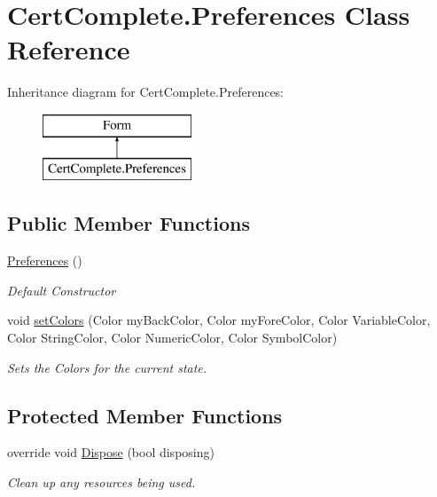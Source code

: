 \hypertarget{class_cert_complete_1_1_preferences}{}\section{Cert\+Complete.\+Preferences Class Reference}
\label{class_cert_complete_1_1_preferences}
Inheritance diagram for Cert\+Complete.\+Preferences\+:\begin{figure}[H]
\begin{center}
\leavevmode
\includegraphics[height=2.000000cm]{class_cert_complete_1_1_preferences}
\end{center}
\end{figure}
\subsection*{Public Member Functions}
\begin{DoxyCompactItemize}
\item 
\mbox{\hyperlink{class_cert_complete_1_1_preferences_a5a7e543437dd3ef1fcde6476be53edaa}{Preferences}} ()
\begin{DoxyCompactList}\small\item\em Default Constructor \end{DoxyCompactList}\item 
void \mbox{\hyperlink{class_cert_complete_1_1_preferences_ad2b97416252271eac8181d91641cd5bf}{set\+Colors}} (Color my\+Back\+Color, Color my\+Fore\+Color, Color Variable\+Color, Color String\+Color, Color Numeric\+Color, Color Symbol\+Color)
\begin{DoxyCompactList}\small\item\em Sets the Colors for the current state. \end{DoxyCompactList}\end{DoxyCompactItemize}
\subsection*{Protected Member Functions}
\begin{DoxyCompactItemize}
\item 
override void \mbox{\hyperlink{class_cert_complete_1_1_preferences_a847c9ae1a1666bbdb1beb4b93f1471e7}{Dispose}} (bool disposing)
\begin{DoxyCompactList}\small\item\em Clean up any resources being used. \end{DoxyCompactList}\end{DoxyCompactItemize}
